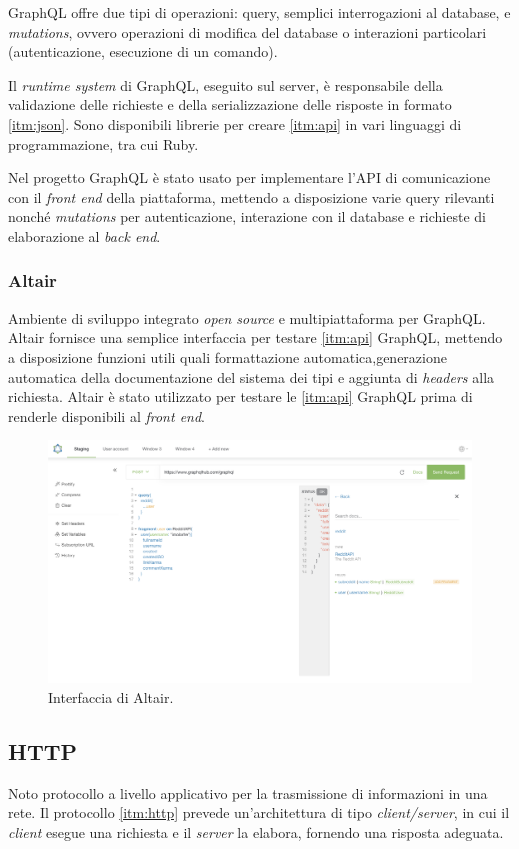GraphQL offre due tipi di operazioni: query, semplici interrogazioni al database, e \textit{mutations}, ovvero operazioni di modifica del database o interazioni particolari (autenticazione, esecuzione di un comando).

Il \textit{runtime system} di GraphQL, eseguito sul server, è responsabile della validazione delle richieste e della serializzazione delle risposte in formato \ref{itm:json}. Sono disponibili librerie per creare \ref{itm:api} in vari linguaggi di programmazione, tra cui Ruby.

Nel progetto GraphQL è stato usato per implementare l'API di comunicazione con il \textit{front end} della piattaforma, mettendo a disposizione varie query rilevanti nonché \textit{mutations} per autenticazione, interazione con il database e richieste di elaborazione al \textit{back end}.

\subsubsection{Altair}
Ambiente di sviluppo integrato \textit{open source} e multipiattaforma per GraphQL. Altair fornisce una semplice interfaccia per testare \ref{itm:api} GraphQL, mettendo a disposizione funzioni utili quali  formattazione automatica,generazione automatica della documentazione del sistema dei tipi e aggiunta di \textit{headers} alla richiesta. Altair è stato utilizzato per testare le \ref{itm:api} GraphQL prima di renderle disponibili al \textit{front end}.
\begin{figure}[h!]
    \centering
    \includegraphics[width=\textwidth]{figures/altair.png}
    \caption[Interfaccia di Altair]{Interfaccia di Altair.
    \label{fig:altair}}
\end{figure}

\subsection{HTTP}
Noto protocollo a livello applicativo per la trasmissione di informazioni in una rete. Il protocollo \ref{itm:http} prevede un'architettura di tipo \textit{client/server}, in cui il \textit{client} esegue una richiesta e il \textit{server} la elabora, fornendo una risposta adeguata.

